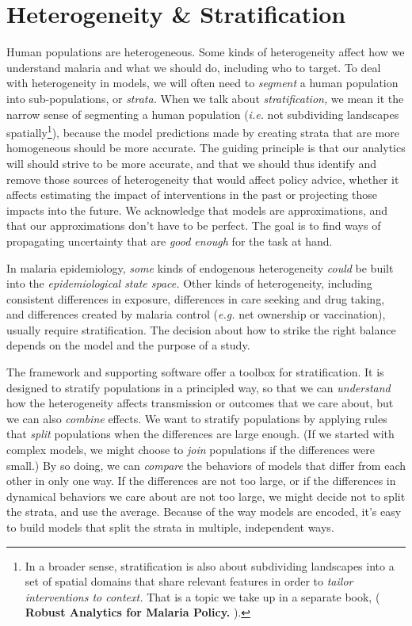 \documentclass[
]{book}
\begin{document}
\section{Heterogeneity \& Stratification}\label{heterogeneity-stratification}

Human populations are heterogeneous. Some kinds of heterogeneity affect how we understand malaria and what we should do, including who to target. To deal with heterogeneity in models, we will often need to \emph{segment} a human population into sub-populations, or \emph{strata.} When we talk about \emph{stratification,} we mean it the narrow sense of segmenting a human population (\emph{i.e.} not subdividing landscapes spatially\footnote{In a broader sense, stratification is also about subdividing landscapes into a set of spatial domains that share relevant features in order to \emph{tailor interventions to context.} That is a topic we take up in a separate book, ( \textbf{Robust Analytics for Malaria Policy.} ).}), because the model predictions made by creating strata that are more homogeneous should be more accurate. The guiding principle is that our analytics will should strive to be more accurate, and that we should thus identify and remove those sources of heterogeneity that would affect policy advice, whether it affects estimating the impact of interventions in the past or projecting those impacts into the future. We acknowledge that models are approximations, and that our approximations don't have to be perfect. The goal is to find ways of propagating uncertainty that are \emph{good enough} for the task at hand.

In malaria epidemiology, \emph{some} kinds of endogenous heterogeneity \emph{could} be built into the \emph{epidemiological state space.} Other kinds of heterogeneity, including consistent differences in exposure, differences in care seeking and drug taking, and differences created by malaria control (\emph{e.g.} net ownership or vaccination), usually require stratification. The decision about how to strike the right balance depends on the model and the purpose of a study.

The framework and supporting software offer a toolbox for stratification. It is designed to stratify populations in a principled way, so that we can \emph{understand} how the heterogeneity affects transmission or outcomes that we care about, but we can also \emph{combine} effects. We want to stratify populations by applying rules that \emph{split} populations when the differences are large enough. (If we started with complex models, we might choose to \emph{join} populations if the differences were small.) By so doing, we can \emph{compare} the behaviors of models that differ from each other in only one way. If the differences are not too large, or if the differences in dynamical behaviors we care about are not too large, we might decide not to split the strata, and use the average. Because of the way models are encoded, it's easy to build models that split the strata in multiple, independent ways.
\end{document}
